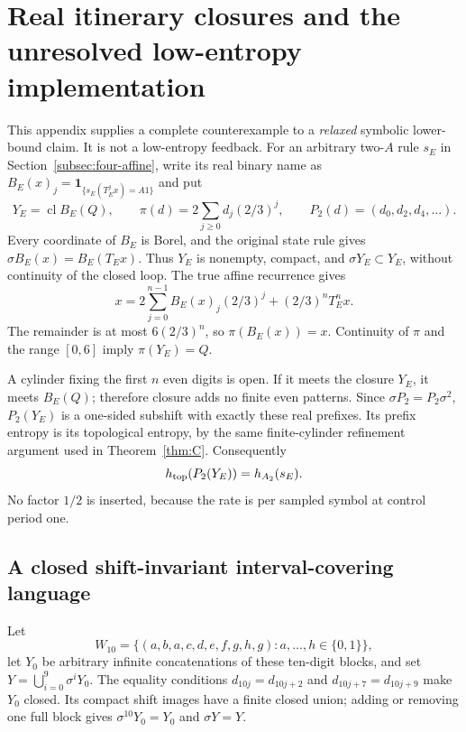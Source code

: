 \documentclass[11pt,reqno]{amsart}
\numberwithin{equation}{section}
\theoremstyle{definition}
\newcommand{\one}{\mathbf 1}
\newcommand{\cl}{\operatorname{cl}}
\begin{document}
\section{Real itinerary closures and the unresolved low-entropy implementation}
\label{app:language}

This appendix supplies a complete counterexample to a \emph{relaxed}
symbolic lower-bound claim. It is not a low-entropy feedback.
For an arbitrary two-$A$ rule $s_E$ in
Section~\ref{subsec:four-affine}, write its real binary name as
$B_E(x)_j=\one_{\{s_E(T_E^jx)=A1\}}$ and put
\[
 Y_E=\cl B_E(Q),\qquad
 \pi(d)=2\sum_{j\ge0}d_j(2/3)^j,
 \qquad P_2(d)=(d_0,d_2,d_4,\ldots).
\]
Every coordinate of $B_E$ is Borel, and the original state rule
gives $\sigma B_E(x)=B_E(T_Ex)$. Thus $Y_E$ is nonempty,
compact, and $\sigma Y_E\subset Y_E$, without continuity of
the closed loop. The true affine recurrence gives
\[
 x=2\sum_{j=0}^{n-1}B_E(x)_j(2/3)^j+(2/3)^nT_E^nx.
\]
The remainder is at most $6(2/3)^n$, so $\pi(B_E(x))=x$.
Continuity of $\pi$ and the range $[0,6]$ imply
$\pi(Y_E)=Q$.

A cylinder fixing the first $n$ even digits is open. If it meets
the closure $Y_E$, it meets $B_E(Q)$; therefore closure adds
no finite even patterns. Since $\sigma P_2=P_2\sigma^2$,
$P_2(Y_E)$ is a one-sided subshift with exactly these real
prefixes. Its prefix entropy is its topological entropy, by the
same finite-cylinder refinement argument used in
Theorem~\ref{thm:C}. Consequently
\begin{equation}\label{eq:closure-even}
 h_{\rm top}(P_2(Y_E))=h_{A_2}(s_E).
\end{equation}
No factor $1/2$ is inserted, because the rate is per sampled
symbol at control period one.

\subsection{A closed shift-invariant interval-covering language}
Let
\[
 W_{10}=\{(a,b,a,c,d,e,f,g,h,g):a,\ldots,h\in\{0,1\}\},
\]
let $Y_0$ be arbitrary infinite concatenations of these ten-digit
blocks, and set $Y=\bigcup_{i=0}^9\sigma^iY_0$.
The equality conditions $d_{10j}=d_{10j+2}$ and
$d_{10j+7}=d_{10j+9}$ make $Y_0$ closed.
Its compact shift images have a finite closed union; adding or
removing one full block gives $\sigma^{10}Y_0=Y_0$ and
$\sigma Y=Y$.
\end{document}

